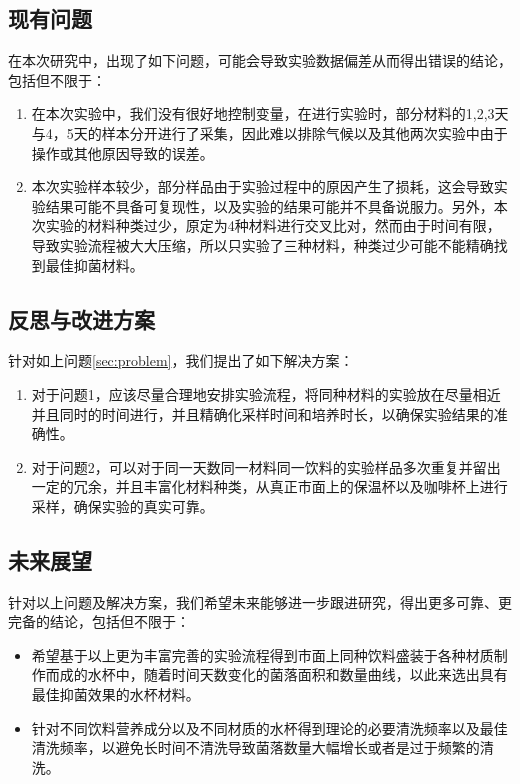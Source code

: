 \documentclass[12pt,a4paper]{ctexart}
\begin{document}
\subsection{现有问题}
在本次研究中，出现了如下问题，可能会导致实验数据偏差从而得出错误的结论，包括但不限于：
\begin{enumerate}
    \item 在本次实验中，我们没有很好地控制变量，在进行实验时，部分材料的1,2,3天与4，5天的样本分开进行了采集，因此难以排除气候以及其他两次实验中由于操作或其他原因导致的误差。
    \item 本次实验样本较少，部分样品由于实验过程中的原因产生了损耗，这会导致实验结果可能不具备可复现性，以及实验的结果可能并不具备说服力。另外，本次实验的材料种类过少，原定为4种材料进行交叉比对，然而由于时间有限，导致实验流程被大大压缩，所以只实验了三种材料，种类过少可能不能精确找到最佳抑菌材料。
\end{enumerate}

\subsection{反思与改进方案}
针对如上问题\ref{sec:problem}，我们提出了如下解决方案：
\begin{enumerate}
    \item 对于问题1，应该尽量合理地安排实验流程，将同种材料的实验放在尽量相近并且同时的时间进行，并且精确化采样时间和培养时长，以确保实验结果的准确性。
    \item 对于问题2，可以对于同一天数同一材料同一饮料的实验样品多次重复并留出一定的冗余，并且丰富化材料种类，从真正市面上的保温杯以及咖啡杯上进行采样，确保实验的真实可靠。
\end{enumerate}

\subsection{未来展望}
针对以上问题及解决方案，我们希望未来能够进一步跟进研究，得出更多可靠、更完备的结论，包括但不限于：
\begin{itemize}
    \item 希望基于以上更为丰富完善的实验流程得到市面上同种饮料盛装于各种材质制作而成的水杯中，随着时间天数变化的菌落面积和数量曲线，以此来选出具有最佳抑菌效果的水杯材料。
    \item 针对不同饮料营养成分以及不同材质的水杯得到理论的必要清洗频率以及最佳清洗频率，以避免长时间不清洗导致菌落数量大幅增长或者是过于频繁的清洗。
\end{itemize}
\end{document}
